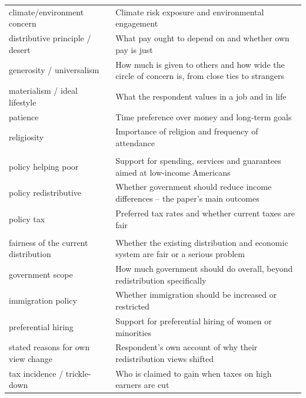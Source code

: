 \documentclass[11pt, headsepline]{article}
\begin{document}
\begin{longtable}{@{}p{2.2in} p{3.7in}@{}}
\quad climate/environment concern & Climate risk exposure and environmental engagement \\
\quad distributive principle / desert & What pay ought to depend on and whether own pay is just \\
\quad generosity / universalism & How much is given to others and how wide the circle of concern is, from close ties to strangers \\
\quad materialism / ideal lifestyle & What the respondent values in a job and in life \\
\quad patience & Time preference over money and long-term goals \\
\quad religiosity & Importance of religion and frequency of attendance \\
\addlinespace[3pt]\midrule\addlinespace[3pt]
\multicolumn{2}{@{}l}{\bfseries redistributive preferences}\\[2pt]
\quad policy helping poor & Support for spending, services and guarantees aimed at low-income Americans \\
\quad policy redistributive & Whether government should reduce income differences -- the paper's main outcomes \\
\quad policy tax & Preferred tax rates and whether current taxes are fair \\
\addlinespace[4pt]
\multicolumn{2}{@{}l}{\bfseries other preferences}\\[2pt]
\quad fairness of the current distribution & Whether the existing distribution and economic system are fair or a serious problem \\
\quad government scope & How much government should do overall, beyond redistribution specifically \\
\quad immigration policy & Whether immigration should be increased or restricted \\
\quad preferential hiring & Support for preferential hiring of women or minorities \\
\quad stated reasons for own view change & Respondent's own account of why their redistribution views shifted \\
\quad tax incidence / trickle-down & Who is claimed to gain when taxes on high earners are cut \\
\bottomrule
\end{longtable}\endgroup

\end{document}
